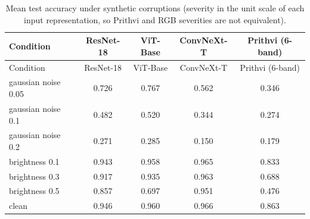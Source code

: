 \begin{longtable}{lcccc}
\caption{Mean test accuracy under synthetic corruptions (severity in the unit scale of each input representation, so Prithvi and RGB severities are not equivalent).}\label{tab:corruption}\\
\toprule Condition & ResNet-18 & ViT-Base & ConvNeXt-T & Prithvi (6-band) \\
\midrule\endfirsthead
\toprule Condition & ResNet-18 & ViT-Base & ConvNeXt-T & Prithvi (6-band) \\
\midrule\endhead
gaussian noise 0.05 & 0.726 & 0.767 & 0.562 & 0.346 \\
gaussian noise 0.1 & 0.482 & 0.520 & 0.344 & 0.274 \\
gaussian noise 0.2 & 0.271 & 0.285 & 0.150 & 0.179 \\
brightness 0.1 & 0.943 & 0.958 & 0.965 & 0.833 \\
brightness 0.3 & 0.917 & 0.935 & 0.963 & 0.688 \\
brightness 0.5 & 0.857 & 0.697 & 0.951 & 0.476 \\
clean & 0.946 & 0.960 & 0.966 & 0.863 \\
\bottomrule
\end{longtable}
